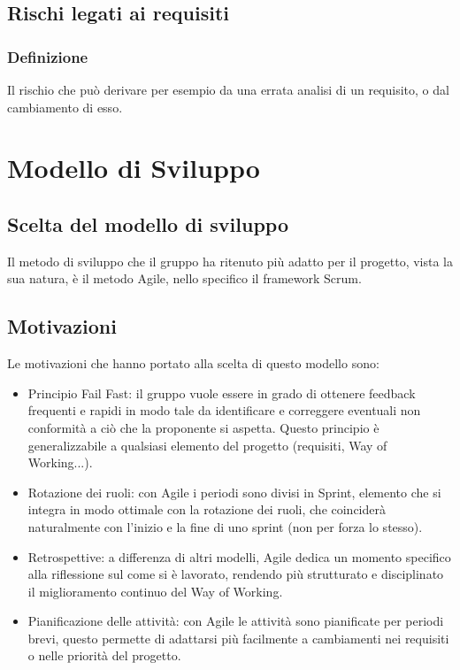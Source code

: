 \documentclass[a4paper,12pt]{article}
\begin{document}
\subsection{Rischi legati ai requisiti}

\subsubsection{Definizione}
Il rischio che può derivare per esempio da una errata analisi di un requisito, o dal cambiamento di esso.





\section{Modello di Sviluppo}

\subsection{Scelta del modello di sviluppo}
Il metodo di sviluppo che il gruppo ha ritenuto più adatto per il progetto, vista la sua natura, è il metodo Agile, nello specifico il framework Scrum.

\subsection{Motivazioni}
Le motivazioni che hanno portato alla scelta di questo modello sono:
\begin{itemize}
    \item Principio Fail Fast: il gruppo vuole essere in grado di ottenere feedback frequenti e rapidi in modo tale da identificare e correggere eventuali non conformità a ciò che la proponente si aspetta. Questo principio è generalizzabile a qualsiasi elemento del progetto (requisiti, Way of Working...).
    \item Rotazione dei ruoli: con Agile i periodi sono divisi in Sprint, elemento che si integra in modo ottimale con la rotazione dei ruoli, che coinciderà naturalmente con l'inizio e la fine di uno sprint (non per forza lo stesso).
    \item Retrospettive: a differenza di altri modelli, Agile dedica un momento specifico alla riflessione sul come si è lavorato, rendendo più strutturato e disciplinato il miglioramento continuo del Way of Working.
    \item Pianificazione delle attività: con Agile le attività sono pianificate per periodi brevi, questo permette di adattarsi più facilmente a cambiamenti nei requisiti o nelle priorità del progetto.
\end{itemize}
\end{document}
